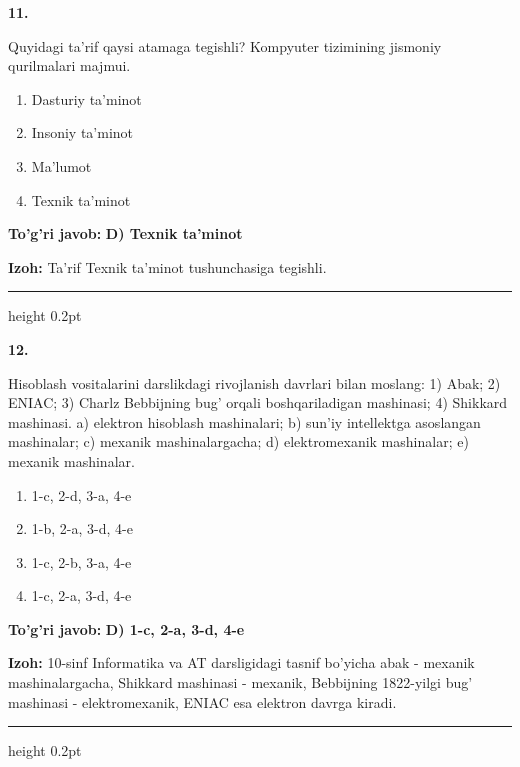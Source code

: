 \documentclass[10pt,a4paper]{article}
\begin{document}
{\bfseries\sffamily\color{ink} 11.}
\par
Quyidagi ta'rif qaysi atamaga tegishli? Kompyuter tizimining jismoniy qurilmalari majmui.
\begin{enumerate}[label=\Alph*),leftmargin=9mm]
\item Dasturiy ta'minot
\item Insoniy ta'minot
\item Ma'lumot
\item Texnik ta'minot
\end{enumerate}
\begin{tcolorbox}[enhanced,breakable,colback=teal!4,colframe=teal!60!black,boxrule=0.45pt,arc=1.2mm,left=2.7mm,right=2.7mm,top=1.8mm,bottom=1.8mm,before skip=2mm,after skip=2mm]
{\bfseries\sffamily\color{teal}To'g'ri javob:} \textbf{D) Texnik ta'minot}
\par\smallskip
{\bfseries Izoh:} Ta'rif Texnik ta'minot tushunchasiga tegishli.
\end{tcolorbox}
\vspace{2mm}\hrule height 0.2pt\vspace{3mm}

{\bfseries\sffamily\color{ink} 12.}
\par
Hisoblash vositalarini darslikdagi rivojlanish davrlari bilan moslang: 1) Abak; 2) ENIAC; 3) Charlz Bebbijning bug' orqali boshqariladigan mashinasi; 4) Shikkard mashinasi. a) elektron hisoblash mashinalari; b) sun'iy intellektga asoslangan mashinalar; c) mexanik mashinalargacha; d) elektromexanik mashinalar; e) mexanik mashinalar.
\begin{enumerate}[label=\Alph*),leftmargin=9mm]
\item 1-c, 2-d, 3-a, 4-e
\item 1-b, 2-a, 3-d, 4-e
\item 1-c, 2-b, 3-a, 4-e
\item 1-c, 2-a, 3-d, 4-e
\end{enumerate}
\begin{tcolorbox}[enhanced,breakable,colback=teal!4,colframe=teal!60!black,boxrule=0.45pt,arc=1.2mm,left=2.7mm,right=2.7mm,top=1.8mm,bottom=1.8mm,before skip=2mm,after skip=2mm]
{\bfseries\sffamily\color{teal}To'g'ri javob:} \textbf{D) 1-c, 2-a, 3-d, 4-e}
\par\smallskip
{\bfseries Izoh:} 10-sinf Informatika va AT darsligidagi tasnif bo'yicha abak - mexanik mashinalargacha, Shikkard mashinasi - mexanik, Bebbijning 1822-yilgi bug' mashinasi - elektromexanik, ENIAC esa elektron davrga kiradi.
\end{tcolorbox}
\vspace{2mm}\hrule height 0.2pt\vspace{3mm}
\end{document}
